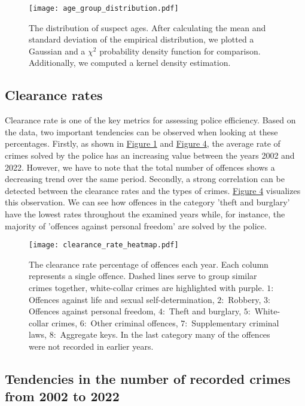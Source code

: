 \documentclass{article}
\theoremstyle{plain}
\theoremstyle{definition}
\theoremstyle{remark}
\begin{document}
\begin{figure}[h!]
    \texttt{[image: age\_group\_distribution.pdf]}
    \caption{The distribution of suspect ages. After calculating the mean and standard deviation of the empirical distribution, we plotted a Gaussian and a $\chi^2$ probability density function for comparison. Additionally, we computed a kernel density estimation.}
    \label{fig:enter-label}
\end{figure}


\subsection{Clearance rates}\label{subsec:results_age}
Clearance rate is one of the key metrics for assessing police efficiency. Based on the data, two important tendencies can be observed when looking at these percentages. Firstly, as shown in \hyperref[fig:intro]{Figure 1} and \hyperref[fig:clearance]{Figure 4}, the average rate of crimes solved by the police has an increasing value between the years 2002 and 2022. However, we have to note that the total number of offences shows a decreasing trend over the same period. Secondly, a strong correlation can be detected between the clearance rates and the types of crimes. \hyperref[fig:clearance]{Figure 4} visualizes this observation. We can see how offences in the category 'theft and burglary' have the lowest rates throughout the examined years while, for instance, the majority of 'offences against personal freedom' are solved by the police.

\begin{figure}[h!]
    \texttt{[image: clearance\_rate\_heatmap.pdf]}
    \caption{The clearance rate percentage of offences each year. Each column represents a single offence. Dashed lines serve to group similar crimes together, white-collar crimes are highlighted with purple. $1:$ Offences against life and sexual self-determination, $2:$ Robbery, $3:$ Offences against personal freedom, $4:$ Theft and burglary, $5:$ White-collar crimes, $6:$ Other criminal offences, $7:$ Supplementary criminal laws, $8:$ Aggregate keys. In the last category many of the offences were not recorded in earlier years.}
    \label{fig:clearance}
\end{figure}

\subsection{Tendencies in the number of recorded crimes from 2002 to 2022}
\end{document}

